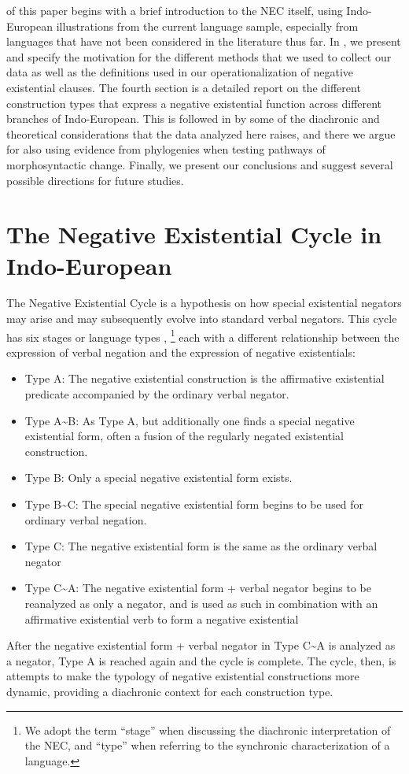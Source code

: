 ﻿\documentclass[output=paper]{langsci/langscibook}
\begin{document}
 of this paper begins with a brief introduction to the
NEC itself, using Indo-European illustrations from the current language
sample, especially from languages that have not been considered in the
literature thus far. In , we present and specify the
motivation for the different methods that we used to collect our data as
well as the definitions used in our operationalization of negative
existential clauses. The fourth section is a detailed report on the
different construction types that express a negative existential function
across different branches of Indo-European. This is followed in
 by some of the diachronic and theoretical
considerations that the data analyzed here raises, and there we argue for
also using evidence from phylogenies when testing pathways of
morphosyntactic change. Finally, we present our conclusions and suggest
several possible directions for future studies.

\section{The Negative Existential Cycle in Indo-European}\label{sec:ieur-2}

The Negative Existential Cycle \citep{Croft1991} is a hypothesis on how
special existential negators may arise and may subsequently evolve into
standard verbal negators. This cycle has six stages \citep{Veselinova2014}
or language types \citep{Croft1991},%
%
    \footnote{We adopt the term ``stage'' when
    discussing the diachronic interpretation of the NEC, and ``type'' when
    referring to the synchronic characterization of a language.}
%
each with a
different relationship between the expression of verbal negation and the
expression of negative existentials:
%
\begin{itemize}
\item Type A: The negative existential construction is the affirmative existential predicate accompanied by the ordinary verbal negator.
\item Type A{\textasciitilde}B: As Type A, but additionally one finds a special negative existential form, often a fusion of the regularly negated existential construction.
\item Type B: Only a special negative existential form exists.
\item Type B{\textasciitilde}C: The special negative existential form begins to be used for ordinary verbal negation.
\item Type C: The negative existential form is the same as the ordinary verbal negator
\item Type C{\textasciitilde}A: The negative existential form + verbal negator begins to be reanalyzed as only a negator, and is used as such in combination with an affirmative existential verb to form a negative existential
\end{itemize}
%
After the negative existential form + verbal negator in Type C{\textasciitilde}A is analyzed as a negator, Type A is reached again and the cycle is complete. The cycle, then, is attempts to make the typology of negative existential constructions more dynamic, providing a diachronic context for each construction type.
\end{document}
